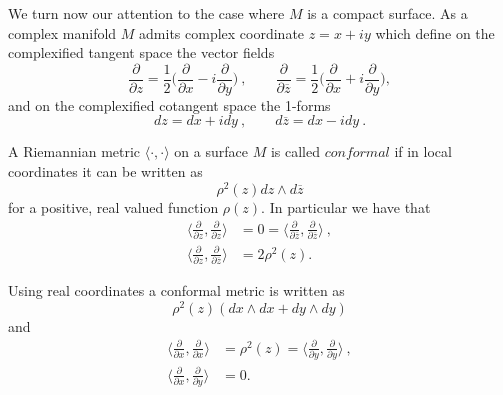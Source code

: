 We turn now our attention to the case where $M$ is a compact surface. As a complex manifold $M$ admits complex coordinate $z=x + iy$ which define on the complexified tangent space the vector fields
\[
\frac{\partial}{\partial z} = \frac{1}{2} \Big(\frac{\partial}{\partial x} -i \frac{\partial}{\partial y} \Big) \ , \qquad \frac{\partial}{\partial \overline{z}} = \frac{1}{2} \Big(\frac{\partial}{\partial x} + i \frac{\partial}{\partial y} \Big) ,
\]
and on the complexified cotangent space the 1-forms
\[
dz = dx + idy \ , \qquad d\overline{z} = dx - idy \ .
\]
\begin{definition}
    A Riemannian metric $\langle \cdot , \cdot \rangle$ on a surface $M$ is called $\textit{conformal}$ if in local coordinates it can be written as
    \[
        \rho^2(z) dz \wedge d\overline{z}
    \]
    for a positive, real valued function $\rho(z)$. In particular we have that
    \[
    \begin{split}
        \Big\langle \frac{\partial}{\partial z}, \frac{\partial}{\partial z} \Big\rangle & = 0 = \Big\langle \frac{\partial}{\partial \overline{z}}, \frac{\partial}{\partial \overline{z}} \Big\rangle \ , \\
         \Big\langle \frac{\partial}{\partial z}, \frac{\partial}{\partial \overline{z}} \Big\rangle & = 2 \rho^2(z).
    \end{split}
    \]
\end{definition}
\begin{observation}
    Using real coordinates a conformal metric is written as 
    \[
        \rho^2(z) (dx \wedge dx + dy \wedge dy)
    \]
    and
    \[
    \begin{split}
        \Big\langle \frac{\partial}{\partial x}, \frac{\partial}{\partial x} \Big\rangle & = \rho^2(z) = \Big\langle \frac{\partial}{\partial y}, \frac{\partial}{\partial y} \Big\rangle \ , \\
         \Big\langle \frac{\partial}{\partial x}, \frac{\partial}{\partial y} \Big\rangle & = 0.
    \end{split}
    \]
\end{observation}

